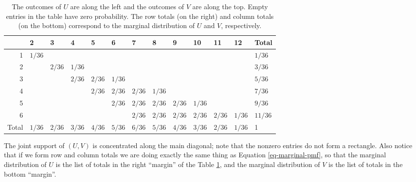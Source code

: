 \documentclass[captions=tableheading]{scrbook}
\begin{document}
\begin{example}
\begin{table}[htb]
\caption[The joint PMF of \((U,V)\)]{The outcomes of \(U\) are along the left and the outcomes of \(V\) are along the top. Empty entries in the table have zero probability. The row totals (on the right) and column totals (on the bottom) correspond to the marginal distribution of \(U\) and \(V\), respectively.} \label{tab-max-sum-joint-pmf}
\begin{center}
\begin{tabular}{r|lllllllllll|l}
        &  2         &  3         &  4         &  5         &  6         &  7         &  8         &  9         &  10        &  11        &  12        &  Total      \\
\hline
     1  &  \(1/36\)  &            &            &            &            &            &            &            &            &            &            &  \(1/36\)   \\
     2  &            &  \(2/36\)  &  \(1/36\)  &            &            &            &            &            &            &            &            &  \(3/36\)   \\
     3  &            &            &  \(2/36\)  &  \(2/36\)  &  \(1/36\)  &            &            &            &            &            &            &  \(5/36\)   \\
     4  &            &            &            &  \(2/36\)  &  \(2/36\)  &  \(2/36\)  &  \(1/36\)  &            &            &            &            &  \(7/36\)   \\
     5  &            &            &            &            &  \(2/36\)  &  \(2/36\)  &  \(2/36\)  &  \(2/36\)  &  \(1/36\)  &            &            &  \(9/36\)   \\
     6  &            &            &            &            &            &  \(2/36\)  &  \(2/36\)  &  \(2/36\)  &  \(2/36\)  &  \(2/36\)  &  \(1/36\)  &  \(11/36\)  \\
\hline
 Total  &  \(1/36\)  &  \(2/36\)  &  \(3/36\)  &  \(4/36\)  &  \(5/36\)  &  \(6/36\)  &  \(5/36\)  &  \(4/36\)  &  \(3/36\)  &  \(2/36\)  &  \(1/36\)  &  1          \\
\end{tabular}
\end{center}
\end{table}


The joint support of \((U,V)\) is concentrated along the main diagonal;  note that the nonzero entries do not form a rectangle. Also notice that if we form row and column totals we are doing exactly the same thing as Equation \ref{eq-marginal-pmf}, so that the marginal distribution of \(U\) is the list of totals in the right ``margin'' of the Table \ref{tab-max-sum-joint-pmf}, and the marginal distribution of \(V\)  is the list of totals in the bottom ``margin''. 
\end{example}
\end{document}
